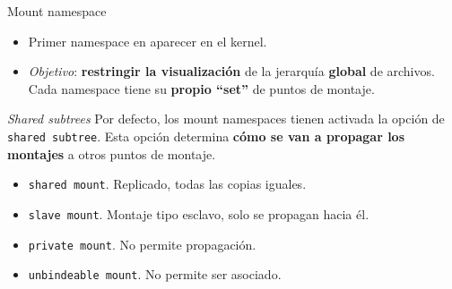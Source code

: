 \documentclass[aspectratio=169,xcolor=dvipsnames]{beamer}
\begin{document}
    \begin{frame}{Mount namespace}
        \begin{itemize}
            \item Primer namespace en aparecer en el kernel.
            \item \textit{Objetivo}: \textbf{restringir la visualización} de la jerarquía \textbf{global} de archivos. Cada namespace tiene su \textbf{propio ``set''} de puntos de montaje.
        \end{itemize}
        
        \begin{alertblock}{\textit{Shared subtrees}}
        Por defecto, los mount namespaces tienen activada la opción de \texttt{shared subtree}. Esta opción determina \textbf{cómo se van a propagar los montajes} a otros puntos de montaje.
        \begin{itemize}
            \item \texttt{shared mount}. Replicado, todas las copias iguales.
            \item \texttt{slave mount}. Montaje tipo esclavo, solo se propagan hacia él.
            \item \texttt{private mount}. No permite propagación.
            \item \texttt{unbindeable mount}. No permite ser asociado.
        \end{itemize}
        \end{alertblock}
    \end{frame}
    
\end{document}
